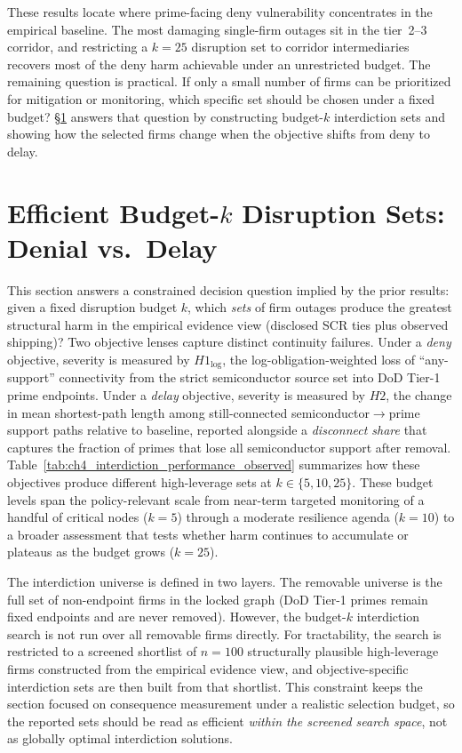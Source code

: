 These results locate where prime-facing deny vulnerability concentrates in the empirical baseline. The most damaging single-firm outages sit in the tier~2--3 corridor, and restricting a $k=25$ disruption set to corridor intermediaries recovers most of the deny harm achievable under an unrestricted budget. The remaining question is practical. If only a small number of firms can be prioritized for mitigation or monitoring, which specific set should be chosen under a fixed budget? \S\ref{sec:ch4_budget_k} answers that question by constructing budget-$k$ interdiction sets and showing how the selected firms change when the objective shifts from deny to delay.

\section{Efficient Budget-\texorpdfstring{$k$}{k} Disruption Sets: Denial vs.\ Delay}
\label{sec:ch4_budget_k}

This section answers a constrained decision question implied by the prior results: given a fixed disruption budget $k$, which \emph{sets} of firm outages produce the greatest structural harm in the empirical evidence view (disclosed SCR ties plus observed shipping)? Two objective lenses capture distinct continuity failures. Under a \emph{deny} objective, severity is measured by $H1_{\log}$, the log-obligation-weighted loss of ``any-support'' connectivity from the strict semiconductor source set into DoD Tier-1 prime endpoints. Under a \emph{delay} objective, severity is measured by $H2$, the change in mean shortest-path length among still-connected semiconductor$\rightarrow$prime support paths relative to baseline, reported alongside a \emph{disconnect share} that captures the fraction of primes that lose all semiconductor support after removal. Table~\ref{tab:ch4_interdiction_performance_observed} summarizes how these objectives produce different high-leverage sets at $k\in\{5,10,25\}$. These budget levels span the policy-relevant scale from near-term targeted monitoring of a handful of critical nodes ($k=5$) through a moderate resilience agenda ($k=10$) to a broader assessment that tests whether harm continues to accumulate or plateaus as the budget grows ($k=25$).

The interdiction universe is defined in two layers. The removable universe is the full set of non-endpoint firms in the locked graph (DoD Tier-1 primes remain fixed endpoints and are never removed). However, the budget-$k$ interdiction search is not run over all removable firms directly. For tractability, the search is restricted to a screened shortlist of $n=100$ structurally plausible high-leverage firms constructed from the empirical evidence view, and objective-specific interdiction sets are then built from that shortlist. This constraint keeps the section focused on consequence measurement under a realistic selection budget, so the reported sets should be read as efficient \emph{within the screened search space}, not as globally optimal interdiction solutions.

